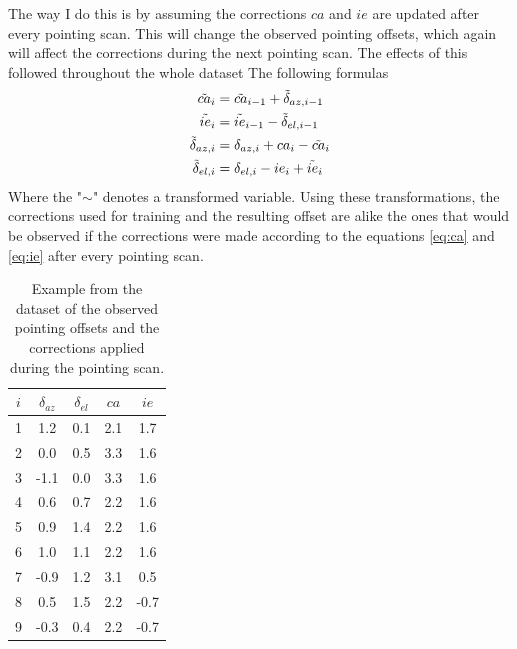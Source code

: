 The way I do this is by assuming the corrections $ca$ and $ie$ are updated after every pointing scan.
This will change the observed pointing offsets, which again will affect the corrections during the next pointing scan.
The effects of this followed throughout the whole dataset
The following formulas 
\begin{align}
    \Tilde{ca}_i &= \Tilde{ca}_{i-1} + \Tilde{\delta}_{az,i-1}\label{eq:ca_tilde}\\
    \Tilde{ie}_i &= \Tilde{ie}_{i-1} - \Tilde{\delta}_{el,i-1\label{eq:ie_tilde}}\\
    \Tilde{\delta}_{az,i} &= \delta_{az,i} + ca_i - \Tilde{ca}_i\label{eq:off_az_tilde}\\
    \Tilde{\delta}_{el,i} &= \delta_{el,i} - ie_i + \Tilde{ie}_i\label{eq:off_el_tilde}
\end{align}
Where the "$\sim$" denotes a transformed variable.
Using these transformations,
the corrections used for training and the resulting offset are alike the ones that would be observed if the corrections were made according to the equations
\eqref{eq:ca} and \eqref{eq:ie} after every pointing scan.


\begin{table}[H]
    \centering
    \caption{Example from the dataset of the observed pointing offsets and the corrections applied during the pointing scan.}
    \label{tab:offset_and_correction}
    \begin{tabular}{ccccc}
    \toprule
    $i$ &  $\delta_{az}$ &  $\delta_{el}$ &  $ca$ & $ie$  \\
    \midrule
    1 & 1.2 & 0.1 & 2.1 &  1.7 \\
    2 &     0.0 & 0.5 & 3.3 &  1.6 \\
    3 &    -1.1 & 0.0 & 3.3 &  1.6 \\
    4 &     0.6 & 0.7 & 2.2 &  1.6 \\
    5 &     0.9 & 1.4 & 2.2 &  1.6 \\
    6 &     1.0 & 1.1 & 2.2 &  1.6 \\
    7 &    -0.9 & 1.2 & 3.1 &  0.5 \\
    8 &     0.5 & 1.5 & 2.2 & -0.7 \\
    9 &    -0.3 & 0.4 & 2.2 & -0.7 \\
    \bottomrule
    \end{tabular}
\end{table}


